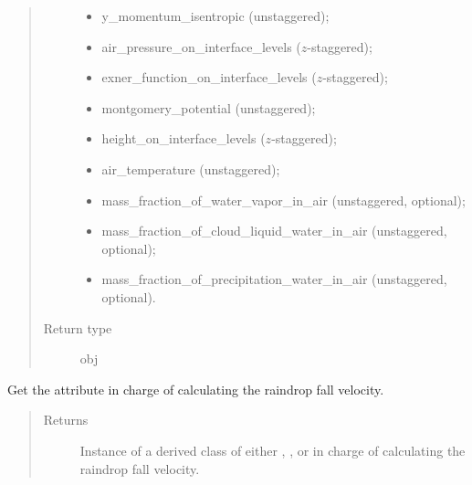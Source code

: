 \documentclass[letterpaper,10pt,english]{sphinxmanual}
\begin{document}
\begin{fulllineitems}
\begin{fulllineitems}
\begin{quote}
\begin{description}
\begin{itemize}
\item {} 
y\_momentum\_isentropic (unstaggered);

\item {} 
air\_pressure\_on\_interface\_levels (\(z\)-staggered);

\item {} 
exner\_function\_on\_interface\_levels (\(z\)-staggered);

\item {} 
montgomery\_potential (unstaggered);

\item {} 
height\_on\_interface\_levels (\(z\)-staggered);

\item {} 
air\_temperature (unstaggered);

\item {} 
mass\_fraction\_of\_water\_vapor\_in\_air (unstaggered, optional);

\item {} 
mass\_fraction\_of\_cloud\_liquid\_water\_in\_air (unstaggered, optional);

\item {} 
mass\_fraction\_of\_precipitation\_water\_in\_air (unstaggered, optional).

\end{itemize}


\item[{Return type}] \leavevmode
obj

\end{description}\end{quote}

\end{fulllineitems}


\begin{fulllineitems}
\label{\detokenize{api:dycore.dycore_isentropic.DynamicalCoreIsentropic.microphysics}}
Get the attribute in charge of calculating the raindrop fall velocity.
\begin{quote}\begin{description}
\item[{Returns}] \leavevmode
Instance of a derived class of either
,
,
or  in
charge of calculating the raindrop fall velocity.


\end{description}
\end{quote}
\end{fulllineitems}
\end{fulllineitems}
\end{document}
